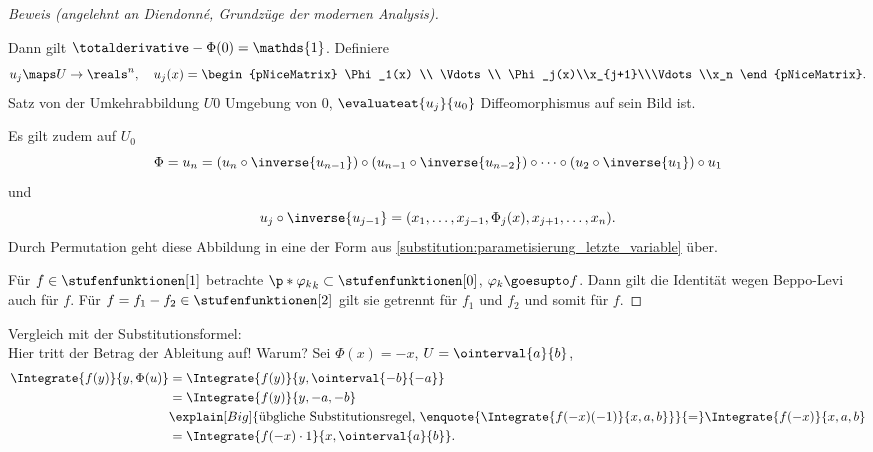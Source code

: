 \begin{proof}[Beweis (angelehnt an Diendonné, Grundzüge der modernen Analysis)]
\begin{enumerate}[label=\rechtsklammer{\arabic*.}]
    Dann gilt \( \totalderivative-{\Phi}(0)=\mathds{1} \). Definiere
    \begin{equation*}
      u_j\maps U\to \reals^n,\quad u_j(x)=\begin{pNiceMatrix} \Phi_1(x) \\ \Vdots \\ \Phi_j(x)\\x_{j+1}\\\Vdots\\x_n \end{pNiceMatrix}.
    \end{equation*}
    Satz von der Umkehrabbildung \timplies \texists \( U0 \) Umgebung von \( 0\), \sd \( \evaluateat{u_j}{u_0} \) Diffeomorphismus auf sein Bild ist.
  \end{enumerate}
  Es gilt zudem auf \( U_0 \)
  \begin{equation*}
    \Phi=u_n=(u_n\circ \inverse{u_{n-1}})\circ (u_{n-1}\circ \inverse{u_{n-2}})\circ\dotsb\circ (u_2\circ \inverse{u_1})\circ u_1
  \end{equation*}
  und
  \begin{equation*}
    u_j\circ \inverse{u_{j-1}}=(x_1,\dotsc,x_{j-1},\Phi_j(x),x_{j+1},\dotsc,x_n).
  \end{equation*}
  Durch Permutation geht diese Abbildung in eine der Form aus \ref{substitution:parametisierung_letzte_variable} über.

  Für \( f\in \stufenfunktionen[1] \) betrachte \( \p*{\varphi_k}_k\subset \stufenfunktionen[0] \), \( \varphi_k\goesupto f \). Dann gilt die Identität wegen Beppo-Levi auch für \( f \). Für \( f=f_1-f_2\in \stufenfunktionen[2] \) gilt sie getrennt für \( f_1 \) und \( f_2 \) und somit für \( f \).

  
\end{proof}
Vergleich mit der Substitutionsformel:\\
Hier tritt der Betrag der Ableitung auf! Warum? Sei \zb \( \Phi(x)=-x \), \( U=\ointerval{a}{b} \),
\begin{align*}
  \Integrate{f(y)}{y,\Phi(u)}&=\Integrate{f(y)}{y,\ointerval{-b}{-a}}\\
  &=\Integrate{f(y)}{y,-a,-b}\\
  &\explain[Big]{\text{übgliche Substitutionsregel, \enquote{\( \Integrate{f(-x)(-1)}{x,a,b} \)}}}{=}\Integrate{f(-x)}{x,a,b}\\
  &=\Integrate{f(-x)\cdot 1}{x,\ointerval{a}{b}}.
\end{align*}
